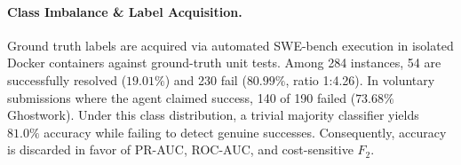 \documentclass[11pt]{article}
\begin{document}
\begin{table}[t]
\centering
\small
{}
\caption{Summary statistics for normal ($N=54$) versus anomalous ($N=230$) agent trajectories.}
\label{tab:dataset_stats}
\end{table}

\paragraph{Class Imbalance \& Label Acquisition.}
Ground truth labels are acquired via automated SWE-bench execution in isolated Docker containers against ground-truth unit tests. Among 284 instances, 54 are successfully resolved ($19.01\%$) and 230 fail ($80.99\%$, ratio 1:4.26). In voluntary submissions where the agent claimed success, 140 of 190 failed ($73.68\%$ Ghostwork). Under this class distribution, a trivial majority classifier yields $81.0\%$ accuracy while failing to detect genuine successes. Consequently, accuracy is discarded in favor of PR-AUC, ROC-AUC, and cost-sensitive $F_2$.
\end{document}

